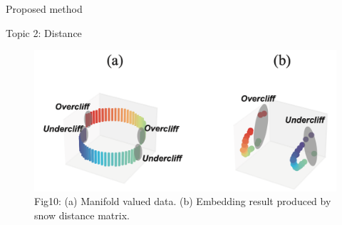 \documentclass[
  ignorenonframetext,
]{beamer}
\begin{document}
\begin{frame}{Proposed method}
\label{proposed-method-3}
\begin{block}{Topic 2: Distance}
\label{topic-2-distance}
\begin{figure}[H]

{\centering \includegraphics{Beamer_files/figure-beamer/2e91521c-95a3-433e-9db0-ef5600641715-1-1bd48489-4286-427e-a563-867c2d28f871.png}

}

\caption{Fig10: (a) Manifold valued data. (b) Embedding result produced
by snow distance matrix.}

\end{figure}%
\end{block}
\end{frame}
\end{document}
